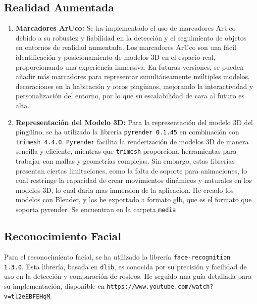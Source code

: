 \documentclass{article}
\begin{document}
\subsection{Realidad Aumentada}

    \begin{enumerate}
        \item \textbf{Marcadores ArUco:} 
        Se ha implementado el uso de marcadores ArUco debido a su robustez y fiabilidad en la detección y el seguimiento de objetos en entornos de realidad aumentada. 
		Los marcadores ArUco son una fácil identificación y posicionamiento de modelos 3D en el espacio real, proporcionando una experiencia inmersiva. En futuras versiones, 
		se pueden añadir más marcadores para representar simultáneamente múltiples modelos, decoraciones en la habitación y otros pingüinos, mejorando la interactividad y personalización del entorno, por lo 
		que su escalabilidad de cara al futuro es alta.

        \item \textbf{Representación del Modelo 3D:}
        Para la representación del modelo 3D del pingüino, se ha utilizado la librería \texttt{pyrender 0.1.45} en combinación con \texttt{trimesh 4.4.0}. 
		\texttt{Pyrender} facilita la renderización de modelos 3D de manera sencilla y eficiente, mientras que \texttt{trimesh} 
		proporciona herramientas para trabajar con mallas y geometrías complejas. Sin embargo, estas librerías presentan ciertas 
		limitaciones, como la falta de soporte para animaciones, lo cual restringe la capacidad de crear movimientos dinámicos y naturales en los modelos 3D, lo cual daria mas inmersion de la aplicacion.
		He creado los modelos con Blender, y los he exportado a formato glb, que es el formato que soporta pyrender. Se encuentran en la carpeta \texttt{media}
    \end{enumerate}

    \subsection{Reconocimiento Facial}

    Para el reconocimiento facial, se ha utilizado la librería \texttt{face-recognition 1.3.0}.
	 Esta librería, basada en \texttt{dlib}, es conocida por su precisión y facilidad de uso en la detección y 
	 comparación de rostros. He seguido una guía detallada para su implementación, disponible en
	 \newline
	  \texttt{https://www.youtube.com/watch?v=tl2eEBFEHqM}.
\end{document}
